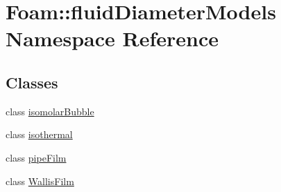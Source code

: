 \hypertarget{namespaceFoam_1_1fluidDiameterModels}{}\section{Foam\+:\+:fluid\+Diameter\+Models Namespace Reference}
\label{namespaceFoam_1_1fluidDiameterModels}
\subsection*{Classes}
\begin{DoxyCompactItemize}
\item 
class \hyperlink{classFoam_1_1fluidDiameterModels_1_1isomolarBubble}{isomolar\+Bubble}
\item 
class \hyperlink{classFoam_1_1fluidDiameterModels_1_1isothermal}{isothermal}
\item 
class \hyperlink{classFoam_1_1fluidDiameterModels_1_1pipeFilm}{pipe\+Film}
\item 
class \hyperlink{classFoam_1_1fluidDiameterModels_1_1WallisFilm}{Wallis\+Film}
\end{DoxyCompactItemize}
